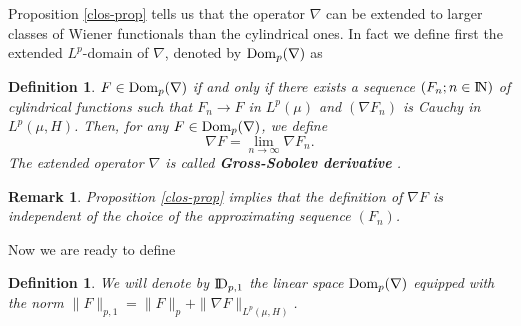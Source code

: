 \documentclass[12pt,a4paper]{book}
\newtheorem{definition}[theorem]{Definition}
\newtheorem{remarkk}[theorem]{Remark}
\newcommand{\DD}{{\rm I\!D}}
\newcommand{\N}{{\rm I\!N}}
\newcommand{\Dom}{{\rm Dom}}
\begin{document}
\noindent
Proposition \ref{clos-prop}  tells us that the operator $\nabla$ can
be extended to larger classes of Wiener functionals than the
cylindrical ones. In fact we  define first the extended  $L^p$-domain
of $\nabla$, denoted  by
${\Dom}_p(\nabla)$\index[not]{dom@${\Dom}_p$} as
\begin{definition}
$F\in{\Dom}_p(\nabla)$ if and only if there exists a sequence
$(F_n;n\in \N)$ of  cylindrical functions  such that
 $F_n\to F$ in $L^p(\mu)$ and $(\nabla F_n)$ is Cauchy in $L^p(\mu,H)$.
Then, for any $F\in {\Dom}_p(\nabla)$,  we define
$$
\nabla F=\lim_{n\to\infty}\nabla F_n .
$$
The extended operator $\nabla$ is called
{\bf {Gross-Sobolev derivative}}
.
\end{definition}
\begin{remarkk} Proposition \ref{clos-prop} implies that the definition of
$\nabla F$ is independent of the choice of the approximating sequence
$(F_n)$.
\end{remarkk}
Now we are ready to define
\begin{definition}
We will denote by $\DD_{p,1}$ the linear space ${\Dom}_p(\nabla)$ equipped
with the norm $\|F\|_{p,1}=\|F\|_p+\|\nabla F\|_{L^p(\mu,H)}$.
\index[not]{dd@$\DD_{p,1}$}
\end{definition}
\end{document}

